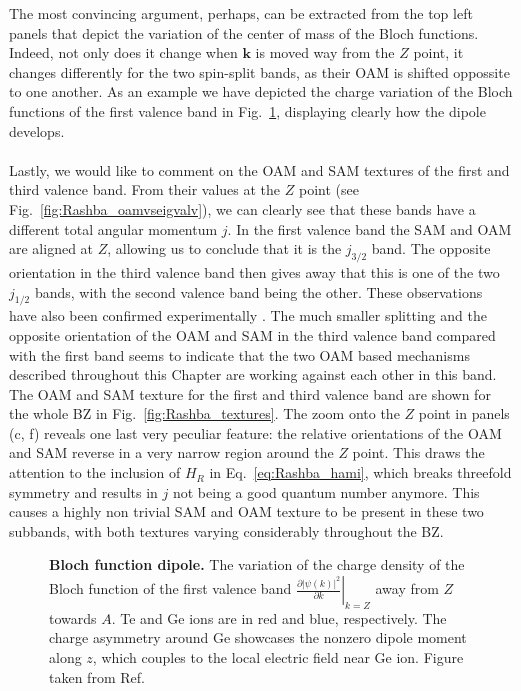 The most convincing argument, perhaps, can be extracted from the top left panels that depict the variation of the center of mass of the Bloch functions. Indeed, not only does it change when $\bm k$ is moved way from the $Z$ point, it changes differently for the two spin-split bands, as their OAM is shifted oppossite to one another.
As an example we have depicted the charge variation of the Bloch functions of the first valence band in Fig.~\ref{fig:Rashba_diffdens}, displaying clearly how the dipole develops.
\\\\
Lastly, we would like to comment on the OAM and SAM textures of the first and third valence band.
From their values at the $Z$ point (see Fig.~\ref{fig:Rashba_oamvseigvalv}), we can clearly see that these bands have a different total angular momentum $j$.
In the first valence band the SAM and OAM are aligned at $Z$, allowing us to conclude that it is the $j_{3/2}$ band. The opposite orientation in the third valence band then gives away that this is one of the two $j_{1/2}$ bands, with the second valence band being the other.
These observations have also been confirmed experimentally \cite{Krempasky2015}.
The much smaller splitting and the opposite orientation of the OAM and SAM in the third valence band compared with the first band seems to indicate that the two OAM based mechanisms described throughout this Chapter are working against each other in this band.
The OAM and SAM texture for the first and third valence band are shown for the whole BZ in Fig.~\ref{fig:Rashba_textures}.
The zoom onto the $Z$ point in panels (c, f) reveals one last very peculiar feature: the relative orientations of the OAM and SAM reverse in a very narrow region around the $Z$ point.
This draws the attention to the inclusion of $H_R$ in Eq.~\eqref{eq:Rashba_hami}, which breaks threefold symmetry and results in $j$ not being a good quantum number anymore. This causes a highly non trivial SAM and OAM texture to be present in these two subbands, with both textures varying considerably throughout the BZ. 


\begin{figure}[h]
\caption{\label{fig:Rashba_diffdens}{\bf Bloch function dipole.} The variation of the charge density of the Bloch function of the first valence band $\left.\frac{\partial |\psi(k)|^2}{\partial k}\right\rvert_{k=Z}$ away from $Z$ towards $A$. Te and Ge ions are in red and blue, respectively. The charge asymmetry around Ge showcases the nonzero dipole moment along $z$, which couples to the local electric field near Ge ion. Figure taken from Ref.~\cite{Ponet2018}}
\end{figure}


